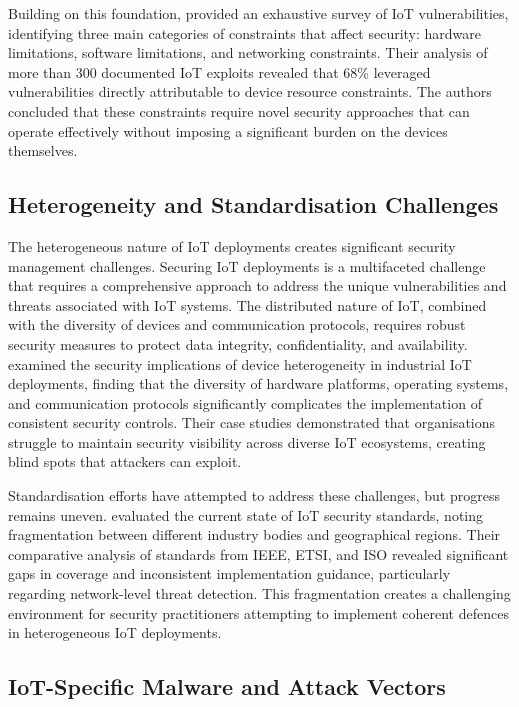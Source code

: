 Building on this foundation, \cite{Neshenko2019} provided an exhaustive survey of IoT vulnerabilities, identifying three main categories of constraints that affect security: hardware limitations, software limitations, and networking constraints. Their analysis of more than 300 documented IoT exploits revealed that 68\% leveraged vulnerabilities directly attributable to device resource constraints. The authors concluded that these constraints require novel security approaches that can operate effectively without imposing a significant burden on the devices themselves.

\subsection{Heterogeneity and Standardisation Challenges}

The heterogeneous nature of IoT deployments creates significant security management challenges. Securing IoT deployments is a multifaceted challenge that requires a comprehensive approach to address the unique vulnerabilities and threats associated with IoT systems. The distributed nature of IoT, combined with the diversity of devices and communication protocols, requires robust security measures to protect data integrity, confidentiality, and availability. \cite{bhattacharjee2018practical} examined the security implications of device heterogeneity in industrial IoT deployments, finding that the diversity of hardware platforms, operating systems, and communication protocols significantly complicates the implementation of consistent security controls. Their case studies demonstrated that organisations struggle to maintain security visibility across diverse IoT ecosystems, creating blind spots that attackers can exploit.

Standardisation efforts have attempted to address these challenges, but progress remains uneven. \cite{Kambourakis2021} evaluated the current state of IoT security standards, noting fragmentation between different industry bodies and geographical regions. Their comparative analysis of standards from IEEE, ETSI, and ISO revealed significant gaps in coverage and inconsistent implementation guidance, particularly regarding network-level threat detection. This fragmentation creates a challenging environment for security practitioners attempting to implement coherent defences in heterogeneous IoT deployments.

\subsection{IoT-Specific Malware and Attack Vectors}

